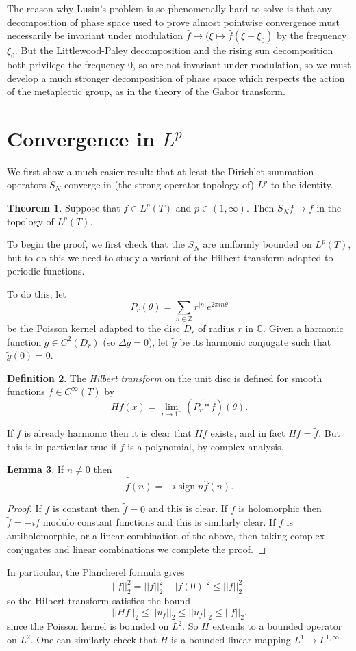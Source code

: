 \documentclass[12pt]{report}
\newcommand{\ZZ}{\mathbb{Z}}
\newcommand{\CC}{\mathbb{C}}
\DeclareMathOperator*{\sgn}{sign}
\newcommand{\dfn}[1]{\emph{#1}\index{#1}}
\theoremstyle{definition}
\newtheorem{theorem}{Theorem}[chapter]
\newtheorem{lemma}[theorem]{Lemma}
\newtheorem{definition}[theorem]{Definition}
\begin{document}
The reason why Lusin's problem is so phenomenally hard to solve is that any decomposition of phase space used to prove almost pointwise convergence must necessarily be invariant under modulation $\hat f \mapsto (\xi \mapsto \hat f(\xi - \xi_0)$ by the frequency $\xi_0$.
But the Littlewood-Paley decomposition and the rising sun decomposition both privilege the frequency $0$, so are not invariant under modulation, so we must develop a much stronger decomposition of phase space which respects the action of the metaplectic group, as in the theory of the Gabor transform.

\section{Convergence in $L^p$}
We first show a much easier result: that at least the Dirichlet summation operators $S_N$ converge in (the strong operator topology of) $L^p$ to the identity.
\begin{theorem}
Suppose that $f \in L^p(T)$ and $p \in (1, \infty)$. Then $S_Nf \to f$ in the topology of $L^p(T)$.
\end{theorem}
To begin the proof, we first check that the $S_N$ are uniformly bounded on $L^p(T)$, but to do this we need to study a variant of the Hilbert transform adapted to periodic functions.

To do this, let
$$P_r(\theta) = \sum_{n \in \ZZ} r^{|n|}e^{2\pi in\theta}$$
be the Poisson kernel adapted to the disc $D_r$ of radius $r$ in $\CC$.
Given a harmonic function $g \in C^2(D_r)$ (so $\Delta g = 0$), let $\tilde g$ be its harmonic conjugate such that $\tilde g(0) = 0$.
\begin{definition}
The \dfn{Hilbert transform} on the unit disc is defined for smooth functions $f \in C^\infty(T)$ by
$$Hf(x) = \lim_{r \to 1^-} (\widetilde{P_r*f})(\theta).$$
\end{definition}
If $f$ is already harmonic then it is clear that $Hf$ exists, and in fact $Hf = \tilde f$.
But this is in particular true if $f$ is a polynomial, by complex analysis.
\begin{lemma}
If $n \neq 0$ then
$$\widehat{\tilde f}(n) = -i \sgn n \hat f(n).$$
\end{lemma}
\begin{proof}
If $f$ is constant then $\tilde f = 0$ and this is clear. If $f$ is holomorphic then $\tilde f = -if$ modulo constant functions and this is similarly clear. If $f$ is antiholomorphic, or a linear combination of the above, then taking complex conjugates and linear combinations we complete the proof.
\end{proof}
In particular, the Plancherel formula gives
$$||\tilde f||_2^2 = ||f||_2^2 - |f(0)|^2 \leq ||f||_2^2,$$
so the Hilbert transform satisfies the bound
$$||Hf||_2 \leq ||\tilde u_f||_2 \leq ||u_f||_2 \leq ||f||_2.$$
since the Poisson kernel is bounded on $L^2$. So $H$ extends to a bounded operator on $L^2$.
One can similarly check that $H$ is a bounded linear mapping $L^1 \to L^{1,\infty}$
\end{document}
